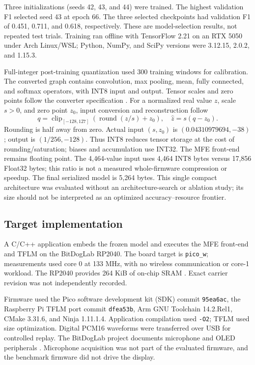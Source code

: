 \documentclass[9pt,twocolumn,twoside,lineno]{MSBJournal}
\begin{document}
Three initializations (seeds 42, 43, and 44) were trained. The highest validation F1 selected seed 43 at epoch 66. The three selected checkpoints had validation F1 of 0.451, 0.711, and 0.618, respectively. These are model-selection results, not repeated test trials. Training ran offline with TensorFlow 2.21 on an RTX 5050 under Arch Linux/WSL; Python, NumPy, and SciPy versions were 3.12.15, 2.0.2, and 1.15.3.

Full-integer post-training quantization used 300 training windows for calibration. The converted graph contains convolution, max pooling, mean, fully connected, and softmax operators, with INT8 input and output. Tensor scales and zero points follow the converter specification \citep{int8spec}. For a normalized real value $z$, scale $s>0$, and zero point $z_0$, input conversion and reconstruction follow
\begin{equation}
q=\operatorname{clip}_{[-128,127]}(\operatorname{round}(z/s)+z_0),
\quad \hat z=s(q-z_0).
\end{equation}
Rounding is half away from zero. Actual input $(s,z_0)$ is $(0.04310979694,-38)$; output is $(1/256,-128)$. Thus INT8 reduces tensor storage at the cost of rounding/saturation; biases and accumulation use INT32. The MFE front-end remains floating point. The 4,464-value input uses 4,464 INT8 bytes versus 17,856 Float32 bytes; this ratio is not a measured whole-firmware compression or speedup. The final serialized model is 5,264 bytes. This single compact architecture was evaluated without an architecture-search or ablation study; its size should not be interpreted as an optimized accuracy--resource frontier.

\subsection{Target implementation}
A C/C++ application embeds the frozen model and executes the MFE front-end and TFLM on the BitDogLab RP2040. The board target is \texttt{pico\_w}; measurements used core 0 at 133 MHz, with no wireless communication or core-1 workload. The RP2040 provides 264 KiB of on-chip SRAM \citep{rp2040docs}. Exact carrier revision was not independently recorded.

Firmware used the Pico software development kit (SDK) commit \texttt{95ea6ac}, the Raspberry Pi TFLM port commit \texttt{dfea53b}, Arm GNU Toolchain 14.2.Rel1, CMake 3.31.6, and Ninja 1.11.1.4. Application compilation used \texttt{-O2}; TFLM used size optimization. Digital PCM16 waveforms were transferred over USB for controlled replay. The BitDogLab project documents microphone and OLED peripherals \citep{bitdoglab}. Microphone acquisition was not part of the evaluated firmware, and the benchmark firmware did not drive the display.
\end{document}
